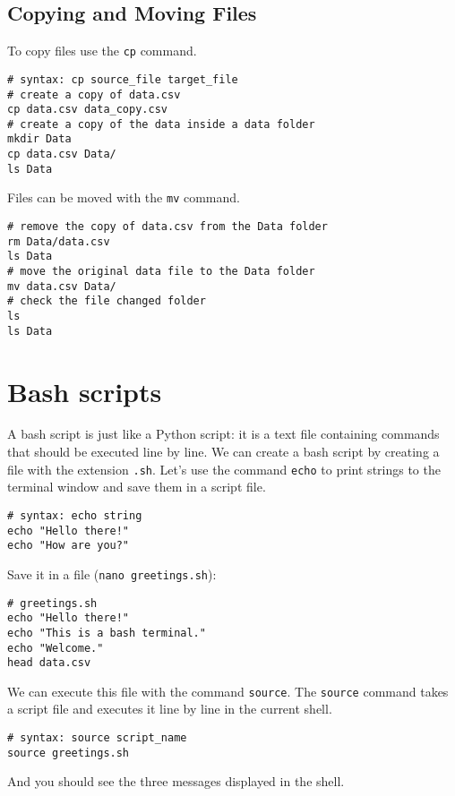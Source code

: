 \documentclass[12pt, a4paper]{article}
\begin{document}
\subsection{Copying and Moving Files}
\label{sec:org02ac16e}
To copy files use the \texttt{cp} command.
\lstset{language=bash,label= ,caption= ,captionpos=b,firstnumber=1,numbers=left,style=bash}
\begin{lstlisting}
# syntax: cp source_file target_file
# create a copy of data.csv
cp data.csv data_copy.csv
# create a copy of the data inside a data folder
mkdir Data
cp data.csv Data/
ls Data
\end{lstlisting}
Files can be moved with the \texttt{mv} command.
\lstset{language=bash,label= ,caption= ,captionpos=b,firstnumber=1,numbers=left,style=bash}
\begin{lstlisting}
# remove the copy of data.csv from the Data folder
rm Data/data.csv
ls Data
# move the original data file to the Data folder
mv data.csv Data/
# check the file changed folder
ls
ls Data
\end{lstlisting}
\section{Bash scripts}
\label{sec:org92342b8}
A bash script is just like a Python script: it is a text file containing commands that should be executed line by line.
We can create a bash script by creating a file with the extension \texttt{.sh}.
Let's use the command \texttt{echo} to print strings to the terminal window and save them in a script file.

\lstset{language=bash,label= ,caption= ,captionpos=b,firstnumber=1,numbers=left,style=bash}
\begin{lstlisting}
# syntax: echo string
echo "Hello there!"
echo "How are you?"
\end{lstlisting}
Save it in a file (\texttt{nano greetings.sh}):

\lstset{language=bash,label= ,caption= ,captionpos=b,firstnumber=1,numbers=left,style=bash}
\begin{lstlisting}
# greetings.sh
echo "Hello there!"
echo "This is a bash terminal."
echo "Welcome."
head data.csv
\end{lstlisting}

We can execute this file with the command \texttt{source}.
The \texttt{source} command takes a script file and executes it line by line in the current shell.
\lstset{language=bash,label= ,caption= ,captionpos=b,firstnumber=1,numbers=left,style=bash}
\begin{lstlisting}
# syntax: source script_name
source greetings.sh
\end{lstlisting}
And you should see the three messages displayed in the shell.
\end{document}

